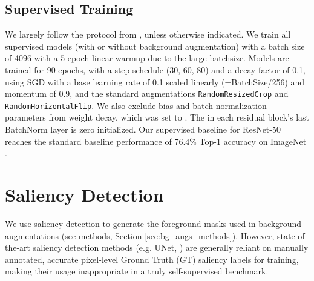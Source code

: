 \documentclass[twoside,11pt]{article}
\begin{document}
\subsection{Supervised Training}
We largely follow the protocol from \citet{goyal_accurate_2018}, unless otherwise indicated. We train all supervised models (with or without background augmentation) with a batch size of 4096 with a 5 epoch linear warmup due to the large batchsize.  Models are trained for 90 epochs, with a step schedule (30, 60, 80) and a decay factor of 0.1, using SGD with a base learning rate of 0.1 scaled linearly (=BatchSize/256) and momentum  of 0.9, and the standard augmentations \texttt{RandomResizedCrop} and \texttt{RandomHorizontalFlip}. We also exclude bias and batch normalization parameters from weight decay, which was set to . The  in each residual block’s last BatchNorm layer is zero initialized. Our supervised baseline for ResNet-50 reaches the standard baseline \citep{goyal_accurate_2018} performance of 76.4\% Top-1 accuracy on ImageNet \citep{imnet1k}.



 \section{Saliency Detection} 
\label{sec:saliency_det}


We use saliency detection to generate the foreground masks used in background augmentations (see methods, Section \ref{sec:bg_augs_methods}). However, state-of-the-art saliency detection methods (e.g. UNet, \citet{u2net}) are generally reliant on manually annotated, accurate pixel-level Ground Truth (GT) saliency labels for training, making their usage inappropriate in a truly self-supervised benchmark. 
\end{document}
